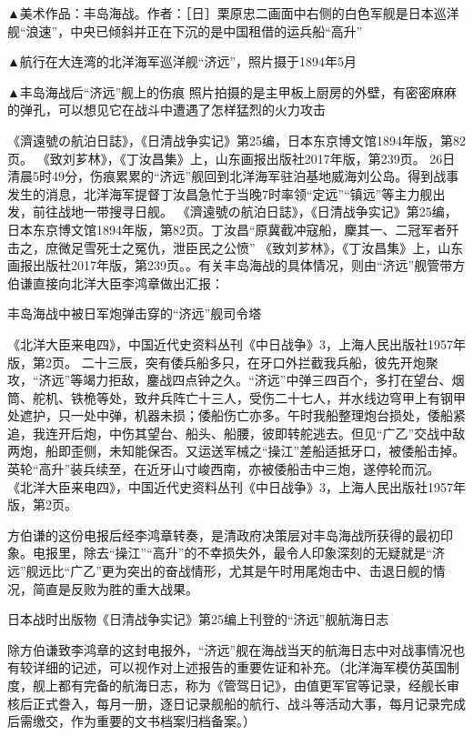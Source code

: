 \documentclass[12pt,UTF8]{ctexbook}
\begin{document}
▲美术作品：丰岛海战。作者：［日］栗原忠二画面中右侧的白色军舰是日本巡洋舰“浪速”，中央已倾斜并正在下沉的是中国租借的运兵船“高升”


▲航行在大连湾的北洋海军巡洋舰“济远”，照片摄于1894年5月


▲丰岛海战后“济远”舰上的伤痕 照片拍摄的是主甲板上厨房的外壁，有密密麻麻的弹孔，可以想见它在战斗中遭遇了怎样猛烈的火力攻击

《濟遠號の航泊日誌》，《日清战争实记》第25编，日本东京博文馆1894年版，第82页。
《致刘芗林》，《丁汝昌集》上，山东画报出版社2017年版，第239页。
26日清晨5时49分，伤痕累累的“济远”舰回到北洋海军驻泊基地威海刘公岛。得到战事发生的消息，北洋海军提督丁汝昌急忙于当晚7时率领“定远”“镇远”等主力舰出发，前往战地一带搜寻日舰。 《濟遠號の航泊日誌》，《日清战争实记》第25编，日本东京博文馆1894年版，第82页。丁汝昌“原冀截冲寇船，麇其一、二冠军者歼击之，庶微足雪死士之冤仇，泄臣民之公愤” 《致刘芗林》，《丁汝昌集》上，山东画报出版社2017年版，第239页。。有关丰岛海战的具体情况，则由“济远”舰管带方伯谦直接向北洋大臣李鸿章做出汇报：


丰岛海战中被日军炮弹击穿的“济远”舰司令塔

《北洋大臣来电四》，中国近代史资料丛刊《中日战争》3，上海人民出版社1957年版，第2页。
二十三辰，突有倭兵船多只，在牙口外拦截我兵船，彼先开炮聚攻，“济远”等竭力拒敌，鏖战四点钟之久。“济远”中弹三四百个，多打在望台、烟筒、舵机、铁桅等处，致弁兵阵亡十三人，受伤二十七人，并水线边穹甲上有钢甲处遮护，只一处中弹，机器未损；倭船伤亡亦多。午时我船整理炮台损处，倭船紧追，我连开后炮，中伤其望台、船头、船腰，彼即转舵逃去。但见“广乙”交战中敌两炮，船即歪侧，未知能保否。又运送军械之“操江”差船适抵牙口，被倭船击掉。英轮“高升”装兵续至，在近牙山寸峻西南，亦被倭船击中三炮，遂停轮而沉。 《北洋大臣来电四》，中国近代史资料丛刊《中日战争》3，上海人民出版社1957年版，第2页。

方伯谦的这份电报后经李鸿章转奏，是清政府决策层对丰岛海战所获得的最初印象。电报里，除去“操江”“高升”的不幸损失外，最令人印象深刻的无疑就是“济远”舰远比“广乙”更为突出的奋战情形，尤其是午时用尾炮击中、击退日舰的情况，简直是反败为胜的重大战果。


日本战时出版物《日清战争实记》第25编上刊登的“济远”舰航海日志

除方伯谦致李鸿章的这封电报外，“济远”舰在海战当天的航海日志中对战事情况也有较详细的记述，可以视作对上述报告的重要佐证和补充。（北洋海军模仿英国制度，舰上都有完备的航海日志，称为《管驾日记》，由值更军官等记录，经舰长审核后正式誊入，每月一册，逐日记录舰船的航行、战斗等活动大事，每月记录完成后需缴交，作为重要的文书档案归档备案。）
\end{document}
